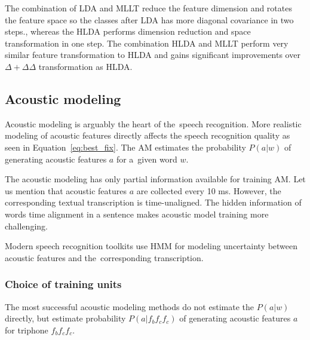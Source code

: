 {The combination of \ac{LDA} and \ac{MLLT} reduce the feature dimension and
rotates the feature space so the classes after \ac{LDA} has more diagonal covariance in two steps.\cite{gopinath1998maximum}, whereas the \ac{HLDA} performs dimension reduction and space transformation in one step.\cite{gales1999semi}
The combination \ac{HLDA} and \ac{MLLT} perform very similar feature transformation to \ac{HLDA}
and gains significant improvements over $\Delta+\Delta\Delta$ transformation 
as \ac{HLDA}\cite{gales1999semi}\cite{gopinath1998maximum}.



\subsection{Acoustic modeling}
\label{sub:am}
Acoustic modeling is arguably the heart of the~speech recognition.
More realistic modeling of acoustic features directly affects the speech recognition quality as seen in Equation~\ref{eq:best_fix}. 
The \ac{AM} estimates the probability $P(a|w)$ of generating acoustic features $a$ for a~given word $w$.

The acoustic modeling has only partial information available for training \ac{AM}.
Let us mention that acoustic features $a$ are collected every 10 ms.
However, the corresponding textual transcription is time-unaligned.
The hidden information of words time alignment in a sentence makes acoustic model training more challenging.

Modern speech recognition toolkits use \acl{HMM}
for modeling uncertainty between acoustic features and the~corresponding transcription. 

\subsubsection*{Choice of training units}
The most successful acoustic modeling methods do not estimate the $P(a|w)$ directly,
but estimate probability $P(a|f_{b}f_{c}f_{c})$ of generating acoustic features $a$ for triphone $f_{b}f_{c}f_{c}$.

}
